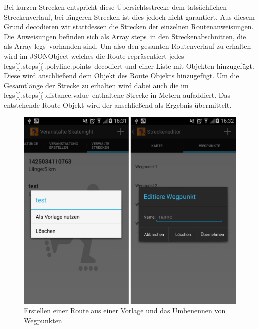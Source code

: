 Bei kurzen Strecken entspricht diese Übersichtsstrecke dem tatsächlichen Streckenverlauf, bei längeren Strecken ist dies jedoch nicht garantiert. Aus diesem Grund decodieren wir stattdessen die Strecken der einzelnen Routenanweisungen. Die Anweisungen befinden sich als Array \glqq steps\grqq\ in den Streckenabschnitten, die als Array \glqq legs\grqq\ vorhanden sind. Um also den gesamten Routenverlauf zu erhalten wird im JSONObject welches die Route repräsentiert jedes \glqq legs[i].steps[j].polyline.points\grqq\ decodiert und einer Liste mit  Objekten hinzugefügt. Diese wird anschließend dem  Objekt des Route Objekts hinzugefügt. Um die Gesamtlänge der Strecke zu erhalten wird dabei auch die im \glqq legs[i].steps[j].distance.value\grqq\ enthaltene Strecke in Metern aufaddiert. Das entstehende Route Objekt wird der  anschließend als Ergebnis übermittelt.


\begin{figure}[htb]
\centering
\includegraphics[width=12cm]{graphics/Route_als_Vorlage_nutzen_Wegpunkte_benennen.png}
\caption{Erstellen einer Route aus einer Vorlage und das Umbenennen von Wegpunkten}
\label{fig:route_aus_vorlage}
\end{figure}

